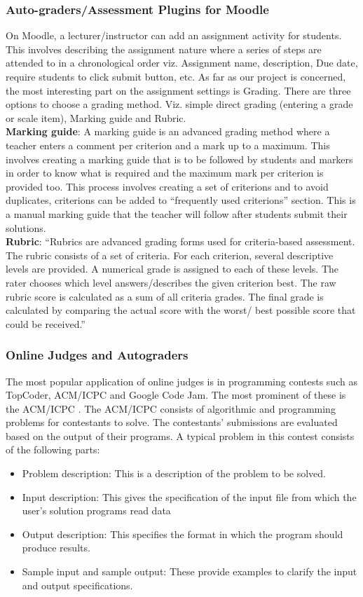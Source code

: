 \documentclass[12pt]{article}
\begin{document}
		 \subsubsection{Auto-graders/Assessment Plugins for Moodle}
		 On Moodle, a lecturer/instructor can add an assignment activity for students. This involves describing the 					assignment nature where a series of steps are attended to in a chronological order viz. Assignment name, 					description, Due date, require students to click submit button, etc. As far as our project is concerned, the most 				interesting part on the assignment settings is Grading. There are three options to choose a grading method. Viz. 				simple direct grading (entering a grade or scale item), Marking guide and Rubric. \\
		 \textbf{Marking guide}: A marking guide is an advanced grading method where a teacher enters a comment per 				criterion and a mark up to a maximum. This involves creating a marking guide that is to be followed by students and 			markers in order to know what is required and the maximum mark per criterion is provided too. This process involves 		creating a set of criterions and to avoid duplicates, criterions can be added to “frequently used criterions” section. 			This is a manual marking guide that the teacher will follow after students submit their solutions. \\
		 \textbf{Rubric}: “Rubrics are advanced grading forms used for criteria-based assessment. The rubric consists of a 			set of criteria. For each criterion, several descriptive levels are provided. A numerical grade is assigned to each of 			these levels. The rater chooses which level answers/describes the given criterion best. The raw rubric score is 				calculated as a sum of all criteria grades. The final grade is calculated by comparing the actual score with the worst/			best possible score that could be received.”
		\subsubsection{Online Judges and Autograders}
		The most popular application of online judges is in programming contests such as TopCoder, ACM/ICPC and Google Code Jam. The most prominent of these is the ACM/ICPC \cite{icpc}. The ACM/ICPC consists of algorithmic and programming problems for contestants to solve. The contestants' submissions are evaluated based on the output of their programs. A typical problem in this contest consists of the following parts:
		\begin{itemize}
			\item Problem description: This is a description of the problem to be solved.
			\item  Input description: This gives the specification of the input file from which the user’s
				solution programs read data
			\item Output description: This specifies the format in which the program should produce
				results.
			\item Sample input and sample output: These provide examples to clarify the input and output
				specifications.
		\end{itemize}
\end{document}
